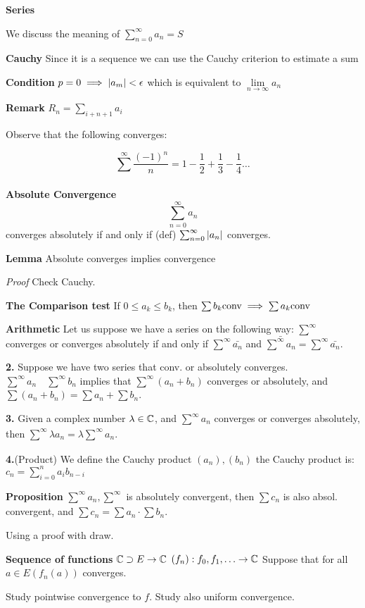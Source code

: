 
\textbf{Series}

We discuss the meaning of $ \sum_{n=0}^{\infty} a_n = S $

\textbf{Cauchy} 
Since it is a sequence we can use the Cauchy criterion to estimate a sum

\textbf{Condition} $  p =0  \implies \left| a_m \right| < \epsilon $ which is equivalent to $ \lim\limits_{n \rightarrow \infty} a_n  $

\textbf{Remark} $ R_n = \sum_{i + n+1}^{} a_i $

Observe that the following converges:

\[ \sum_{}^{\infty} \frac{(-1)^n}{n} = 1 - \frac{1}{2} + \frac{1}{3} - \frac{1}{4} \ldots \]

\textbf{Absolute Convergence}
\[ \sum_{n = 0}^{\infty} a_n \] converges absolutely if and only if (def) $ \sum_{n=0}^{\infty} \left| a_n \right| $ converges.

\textbf{Lemma} Absolute converges implies convergence

\textit{Proof} Check Cauchy. 

\textbf{The Comparison test}
If $ 0 \leq a_k \leq b_k $, then $ \sum b_k \textrm{conv}  \implies \sum a_k \textrm{conv}$

\textbf{Arithmetic}
Let us suppose we have a series on the following way: $  \sum^\infty  $ converges or converges absolutely if and only if $ \sum^\infty \bar{a_n} $ and $ \bar{\sum^\infty a_n} = \sum^\infty \bar{a_n} $.

\textbf{2.} Suppose we have two series that conv. or absolutely converges. $ \sum^\infty a_n \quad \sum^\infty b_n $ implies that $ \sum^\infty (a_n + b_n) $ converges or absolutely, and $ \sum (a_n + b_n) = \sum a_n + \sum b_n $.

\textbf{3.} Given a complex number $ \lambda \in \mathbb{C} $, and $ \sum_{}^{\infty} a_n$ converges or converges absolutely, then $ \sum_{}^{\infty} \lambda a_n  = \lambda \sum_{}^{\infty} a_n$.

\textbf{4.}(Product)
We define the Cauchy product $ (a_n),(b_n) $ the Cauchy product is: $ c_n = \sum_{i=0}^{n} a_ib_{n-i} $

\textbf{Proposition} $ \sum_{}^{\infty} a_n, \sum_{}^{\infty} $ is absolutely convergent, then $ \sum c_n $ is also absol. convergent, and $ \sum c_n = \sum a_n \cdot \sum b_n $.

Using a proof with draw.

\textbf{Sequence of functions} $ \mathbb{C} \supset E \rightarrow \mathbb{C} $ $ (f_n) : f_0,f_1, \ldots \rightarrow \mathbb{C} $ 
Suppose that for all $ a \in E (f_n(a)) $ converges.

Study pointwise convergence to $f$. 
Study also uniform convergence.
